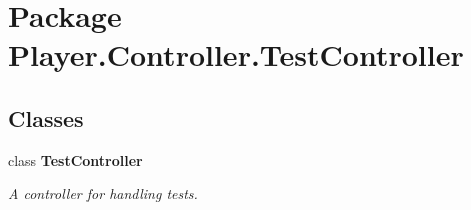 \section{Package Player.\-Controller.\-Test\-Controller}
\label{namespace_player_1_1_controller_1_1_test_controller}
\subsection*{Classes}
\begin{DoxyCompactItemize}
\item 
class {\bf Test\-Controller}
\begin{DoxyCompactList}\small\item\em A controller for handling tests. \end{DoxyCompactList}\end{DoxyCompactItemize}
